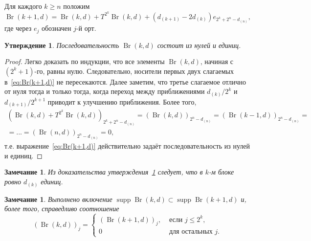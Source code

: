 \documentclass[a4paper,14pt]{article} %
\theoremstyle{plain}
\newtheorem{remark}[lemma]{Замечание}
\newtheorem{proposition}[lemma]{Утверждение}
\begin{document}
Для каждого $k \geq n$ положим
\begin{equation}
	\label{eq:Br(k+1,d)}
	\operatorname{Br}(k+1,d) = \operatorname{Br}(k,d) + T^{2^k}\operatorname{Br}(k,d) + (d_{(k+1)}-2d_{(k)})e_{2^k+2^n-d_{(n)}}
	,
\end{equation}
где через $e_j$ обозначен $j$-й орт.


\begin{proposition}
	\label{prop:Br_k_c_0_1}
	Последовательность $\operatorname{Br}(k,d)$ состоит из нулей и единиц.
\end{proposition}
\begin{proof}
	Легко доказать по индукции, что все элементы $\operatorname{Br}(k,d)$, начиная с $(2^k+1)$-го, равны нулю.
	Следовательно, носители первых двух слагаемых в~\eqref{eq:Br(k+1,d)} не пересекаются.
	Далее заметим, что третье слагаемое отлично от нуля тогда и только тогда,
	когда переход между приближениями $d_{(k)} / 2^k$ и $d_{(k+1)}/2^{k+1}$
	приводит к улучшению приближения.
	Более того,
	\begin{multline}
		\left(\operatorname{Br}(k,d) + T^{2^k}\operatorname{Br}(k,d)\right)_{2^k+2^n-d_{(n)}}
		=
		(\operatorname{Br}(k,d))_{2^n-d_{(n)}}
		=
		(\operatorname{Br}(k-1,d))_{2^n-d_{(n)}}
		=
		\\=
		...
		=
		(\operatorname{Br}(n,d))_{2^n-d_{(n)}}
		=
		0
		,
	\end{multline}
	т.е. выражение~\eqref{eq:Br(k+1,d)} действительно задаёт последовательность из нулей и единиц.
\end{proof}

\begin{remark}
	Из доказательства утверждения~\ref{prop:Br_k_c_0_1} следует, что в $k$-м блоке ровно $d_{(k)}$ единиц.
\end{remark}


\begin{remark}
	Выполнено включение $\operatorname{supp}\operatorname{Br}(k,d) \subset \operatorname{supp}\operatorname{Br}(k+1,d)$
	и, более того, справедливо соотношение
	\begin{equation}
		(\operatorname{Br}(k,d))_j = \begin{cases}
			(\operatorname{Br}(k+1,d))_j, & \mbox{~если~}  j \leq 2^k,
			\\
			0  & \mbox{~для остальных~} j
			.
		\end{cases}
	\end{equation}
\end{remark}
\end{document}
